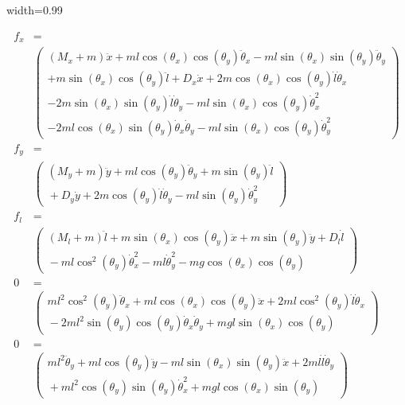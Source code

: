 \documentclass{ppgeesa}
\begin{document}
\begin{adjustbox}{width=0.99\linewidth}
  \parbox{\linewidth}{
  \begin{align}
    f_x &=\nonumber\\
        &\begin{pmatrix}
          (M_x + m)\ddot{x} + ml\cos(\theta_x)\cos(\theta_y)\ddot{\theta}_x - ml\sin(\theta_x)\sin(\theta_y)\ddot{\theta}_y \\
          + m\sin(\theta_x)\cos(\theta_y)\ddot{l} + D_x\dot{x} + 2m\cos(\theta_x)\cos(\theta_y)\dot{l}\dot{\theta}_x \\
          - 2m\sin(\theta_x)\sin(\theta_y)\dot{l}\dot{\theta}_y - ml\sin(\theta_x)\cos(\theta_y)\dot{\theta}_x^2 \\
          - 2ml\cos(\theta_x)\sin(\theta_y)\dot{\theta}_x\dot{\theta}_y - ml\sin(\theta_x)\cos(\theta_y)\dot{\theta}_y^2
        \end{pmatrix}\\
    f_y &=\nonumber\\
        &\begin{pmatrix}
          (M_y + m)\ddot{y} + ml \cos(\theta_y)\ddot{\theta}_y + m\sin(\theta_y)\ddot{l} \\
          {}+ D_y\dot{y} + 2m\cos(\theta_y)\dot{l}\dot{\theta}_y - ml\sin(\theta_y)\dot{\theta}_y^2
        \end{pmatrix}\\
    f_l &=\nonumber\\
        &\begin{pmatrix}
          (M_l + m)\ddot{l} + m\sin(\theta_x)\cos(\theta_y)\ddot{x} + m\sin(\theta_y)\ddot{y} + D_l\dot{l} \\
          {}- ml\cos^2(\theta_y)\dot{\theta}_x^2 - ml\dot{\theta}_y^2 - mg\cos(\theta_x)\cos(\theta_y)
        \end{pmatrix}\\
    0 &=\nonumber\\
      &\begin{pmatrix}
        ml^2\cos^2(\theta_y)\ddot{\theta}_x + ml\cos(\theta_x)\cos(\theta_y)\ddot{x} + 2ml\cos^2(\theta_y)\dot{l}\dot{\theta}_x \\
        {}- 2ml^2\sin(\theta_y)\cos(\theta_y)\dot{\theta}_x\dot{\theta}_y + mgl\sin(\theta_x)\cos(\theta_y)
      \end{pmatrix}\\
    0 &=\nonumber\\
      &\begin{pmatrix}
        ml^2\ddot{\theta}_y + ml\cos(\theta_y)\ddot{y} - ml\sin(\theta_x)\sin(\theta_y)\ddot{x} + 2ml\dot{l}\dot{\theta}_y \\
        {}+ ml^2\cos(\theta_y)\sin(\theta_y)\dot{\theta}_x^2 + mgl\cos(\theta_x)\sin(\theta_y)
      \end{pmatrix}
  \end{align}
}
\end{adjustbox}
\end{document}
